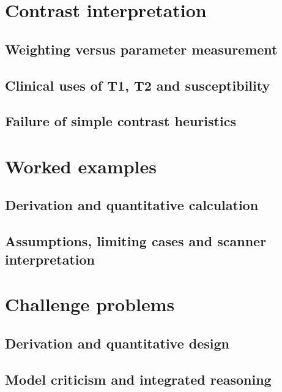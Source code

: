 \section{Contrast interpretation}
\label{sec:09:contrast-interpretation}
\subsection{Weighting versus parameter measurement}
\subsection{Clinical uses of T1, T2 and susceptibility}
\subsection{Failure of simple contrast heuristics}

\section{Worked examples}
\label{sec:09:worked-examples}
\subsection{Derivation and quantitative calculation}
\subsection{Assumptions, limiting cases and scanner interpretation}

\section{Challenge problems}
\label{sec:09:challenge-problems}
\subsection{Derivation and quantitative design}
\subsection{Model criticism and integrated reasoning}
